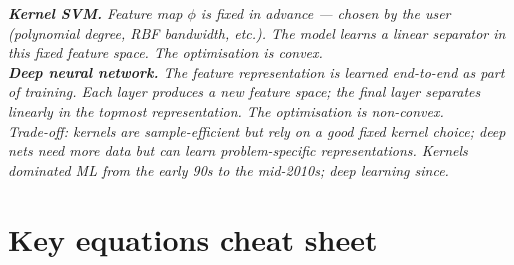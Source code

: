 \documentclass[11pt, a4paper]{article}
\begin{document}
\begin{exambox}
\textit{\textbf{Kernel SVM.} Feature map $\phi$ is fixed in advance — chosen by the user (polynomial degree, RBF bandwidth, etc.). The model learns a linear separator in this fixed feature space. The optimisation is convex.}\\[0.3em]
\textit{\textbf{Deep neural network.} The feature representation is \emph{learned} end-to-end as part of training. Each layer produces a new feature space; the final layer separates linearly in the topmost representation. The optimisation is non-convex.}\\[0.3em]
\textit{Trade-off: kernels are sample-efficient but rely on a good fixed kernel choice; deep nets need more data but can learn problem-specific representations. Kernels dominated ML from the early 90s to the mid-2010s; deep learning since.}
\end{exambox}

\section*{Key equations cheat sheet}
\end{document}
